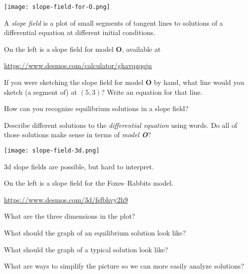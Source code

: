 \documentclass{workbook}
\begin{document}
\begin{slide}

	\question
	
	\begin{center}
	\texttt{[image: slope-field-for-O.png]}
	\end{center}

	A \emph{slope field} is a plot of small segments of tangent lines
	to solutions of a differential equation at different initial conditions.
	
	On the left is a slope field for model \textbf{O}, available at

	\url{https://www.desmos.com/calculator/ghavqzqqjn}

	\begin{parts}
		\item If you were sketching the slope field for model \textbf{O} by hand, what line would you sketch
		(a segment of) at $(5,3)$? Write an equation for that line.
		\item How can you recognize equilibrium solutions in a slope field?
		\item Describe different solutions to the \emph{differential equation} using words. Do all
		of those solutions make sense in terms of \emph{model \textbf{O}}?
	\end{parts}
\end{slide}

\begin{slide}

	\question
	
	\begin{center}
		\texttt{[image: slope-field-3d.png]}
	\end{center}

	3d slope fields are possible, but hard to interpret.

	On the left is a slope field for the Foxes--Rabbits model.

	\url{https://www.desmos.com/3d/fsfbhvy2h9}

	\begin{parts}
		\item What are the three dimensions in the plot?
		\item What should the graph of an equilibrium solution look like?
		\item What should the graph of a typical solution look like?
		\item What are ways to simplify the picture so we can more easily analyze solutions?
	\end{parts}
\end{slide}
\end{document}
